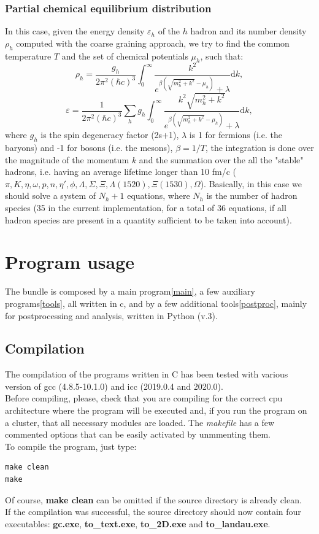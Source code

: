 \documentclass[12pt, a4paper]{article}
\newcommand{\dd}{\mathrm{d}}
\begin{document}
\subsubsection{Partial chemical equilibrium distribution}
In this case, given the energy density $\varepsilon_h$ of the $h$ hadron and its number density $\rho_{h}$ computed with the coarse graining approach, we try to find the common temperature $T$ and the set of chemical potentials $\mu_{h}$, such that:
\begin{equation}
\rho_{h}=\dfrac{g_{h}}{2\pi^2 (\hbar c)^3}\int_0^\infty \dfrac{k^2}{e^{\beta{(\sqrt{m_{h}^2+k^2}-\mu_{h})}}+\lambda}
	\dd k, \label{eq:pce_rho}
\end{equation}
\begin{equation}
	\varepsilon=\dfrac{1}{2\pi^2 (\hbar c)^3}\sum_{h}g_{h}\int_0^\infty \dfrac{k^2\sqrt{m_{h}^2+k^2}}{e^{\beta{(\sqrt{m_{h}^2+k^2}-\mu_{h})}}+\lambda}
	\dd k, \label{eq:pce_en}
\end{equation}
where $g_{h}$ is the spin degeneracy factor (2s+1), $\lambda$ is 1 for fermions (i.e. the baryons) and -1 for bosons (i.e. the mesons), $\beta=1/T$, the integration is done over the magnitude of the momentum $k$ and the summation over the all the "stable" hadrons, i.e. having an average lifetime longer than 10 fm/c ($\pi, K, \eta, \omega, p, n, \eta', \phi, \Lambda, \Sigma, \Xi, \Lambda(1520), \Xi(1530), \Omega$). Basically, in this case we should solve a system of $N_h+1$ equations, where $N_h$ is the number of hadron species (35 in the current implementation, for a total of 36 equations, if all hadron species are present in a quantity sufficient to be taken into account).
\section{Program usage}
The bundle is composed by a main program\ref{main}, a few auxiliary programs\ref{tools}, all written in c, and by a few additional tools\ref{postproc}, mainly for postprocessing and analysis, written in Python (v.3).\\
\subsection{Compilation}
The compilation of the programs written in C has been tested with various version of gcc (4.8.5-10.1.0) and icc (2019.0.4 and 2020.0).\\
Before compiling, please, check that you are compiling for the correct cpu architecture where the program will be executed  and, if you run the program on a cluster, that all necessary modules are loaded. The \emph{makefile} has a few commented options that can be easily activated by unmmenting them.\\
To compile the program, just type:
\begin{verbatim}
make clean
make
\end{verbatim}
Of course, \textbf{make clean} can be omitted if the source directory is already clean.\\
If the compilation was successful, the source directory should now contain four executables: \textbf{gc.exe}, \textbf{to\_text.exe}, \textbf{to\_2D.exe} and \textbf{to\_landau.exe}.
\end{document}
